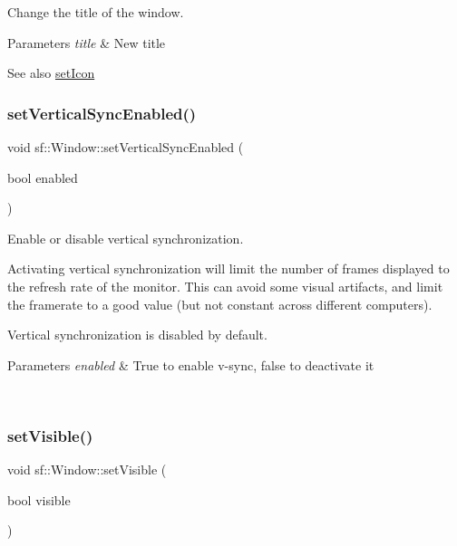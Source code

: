 Change the title of the window. 


\begin{DoxyParams}{Parameters}
{\em title} & New title\\
\hline
\end{DoxyParams}
\begin{DoxySeeAlso}{See also}
\mbox{\hyperlink{classsf_1_1_window_a63af61e026fba08e3153fd013620bcc0}{set\+Icon}} \begin{DoxyVerb}\end{DoxyVerb}
 
\end{DoxySeeAlso}
\mbox{\label{classsf_1_1_window_a59041c4556e0351048f8aff366034f61}} 
\subsubsection{\texorpdfstring{setVerticalSyncEnabled()}{setVerticalSyncEnabled()}}
{\footnotesize\ttfamily void sf\+::\+Window\+::set\+Vertical\+Sync\+Enabled (\begin{DoxyParamCaption}\item[{bool}]{enabled }\end{DoxyParamCaption})}



Enable or disable vertical synchronization. 

Activating vertical synchronization will limit the number of frames displayed to the refresh rate of the monitor. This can avoid some visual artifacts, and limit the framerate to a good value (but not constant across different computers).

Vertical synchronization is disabled by default.


\begin{DoxyParams}{Parameters}
{\em enabled} & True to enable v-\/sync, false to deactivate it \begin{DoxyVerb}\end{DoxyVerb}
 \\
\hline
\end{DoxyParams}
\mbox{\label{classsf_1_1_window_a160f7f11a207603d7e99ce606e749703}} 
\subsubsection{\texorpdfstring{setVisible()}{setVisible()}}
{\footnotesize\ttfamily void sf\+::\+Window\+::set\+Visible (\begin{DoxyParamCaption}\item[{bool}]{visible }\end{DoxyParamCaption})}



